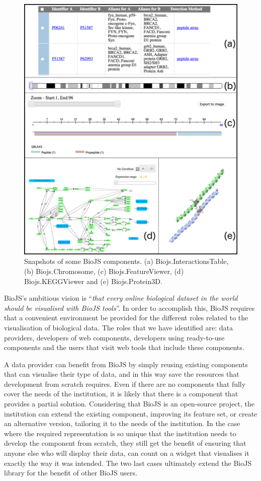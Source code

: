 \begin{figure}  
\centering
\includegraphics[width=\textwidth]{figures/biojs_components.png}
\caption[Snapshots of some BioJS components.]{Snapshots of some BioJS components. (a) Biojs.InteractionsTable, (b) Biojs.Chromosome, (c) Biojs.FeatureViewer, (d) Biojs.KEGGViewer and  (e) Biojs.Protein3D.
\label{fig:biojs_components}}
\end{figure}
 

BioJS's ambitious vision is ``\emph{that every online biological dataset in the world should be visualised with BioJS tools}''. In order to accomplish this, BioJS requires that a convenient environment be provided for the different roles related to the visualisation of biological data. The roles that we have identified are: data providers,  developers of web components, developers using ready-to-use components and the users that visit web tools that include these components.

A data provider can benefit from BioJS by simply reusing existing components that can visualise their type of data, and in this way save the resources that development from scratch requires. Even if there are no components that fully cover the needs of the institution, it is likely that there is a component that provides a partial solution.  Considering that BioJS is an open-source project, the institution can extend the existing component, improving its feature set, or create an alternative version, tailoring it to the needs of the institution. In the case where the required representation is so unique that the institution needs to develop the component from scratch, they still get the benefit of ensuring that anyone else who will display their data, can count on a widget that visualises it exactly the way it was intended. The two last cases ultimately extend the BioJS library for the benefit of other BioJS users.

